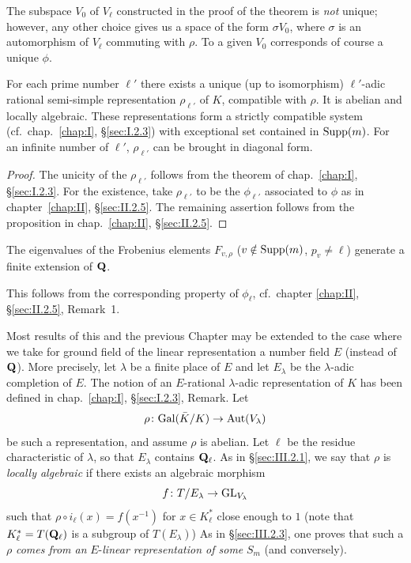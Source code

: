 
The subspace $V_0$ of $V_\ell$ constructed in the proof of the theorem is
\emph{not} unique; however, any other choice gives us a space of the form
$\sigma V_0$, where $\sigma$ is an automorphism of $V_\ell$ commuting
with $\rho$.  To a given $V_0$ corresponds of course a unique $\phi$.

\begin{corollary}[1]\label{cor:III.2.3.1}
For each prime number $\ell'$ there exists a unique (up to isomorphism)
$\ell'$-adic rational semi-simple representation $\rho_{\ell'}$ of $K$,
compatible with $\rho$.  It is abelian and locally algebraic.  These
representations form a strictly compatible system
(cf.~chap.~\ref{chap:I}, \S\ref{sec:I.2.3}) with exceptional set contained
in $\mathrm{Supp}(m)$.  For an infinite number of $\ell'$, $\rho_{\ell'}$ can be
brought in diagonal form.
\end{corollary}

\begin{proof}
The unicity of the $\rho_{\ell'}$ follows from the theorem of
chap.~\ref{chap:I}, \S\ref{sec:I.2.3}.  For the existence, take
$\rho_{\ell'}$ to be the $\phi_{\ell'}$ associated to $\phi$ as in
chapter~\ref{chap:II}, \S\ref{sec:II.2.5}.  The remaining assertion
follows from the proposition in chap.~\ref{chap:II},
\S\ref{sec:II.2.5}.
\end{proof}

\begin{corollary}[2]\label{cor:III.2.3.2}
The eigenvalues of the Frobenius elements $F_{v,\rho}$
($v\notin\mathrm{Supp}(m)$, $p_v\neq\ell$) generate a finite extension of $\mathbf{Q}$.
\end{corollary}

This follows from the corresponding property of $\phi_\ell$, cf.~chapter
\ref{chap:II}, \S\ref{sec:II.2.5}, Remark~1.


Most results of this and the previous Chapter may be extended to the case
where we take for ground field of the linear representation a number
field $E$ (instead of $\mathbf{Q}$).  More precisely, let $\lambda$ be a finite
place of $E$ and let $E_\lambda$ be the $\lambda$-adic completion of $E$.
The notion of an $E$-rational $\lambda$-adic representation of $K$ has
been defined in chap.~\ref{chap:I}, \S\ref{sec:I.2.3}, Remark.  Let
\[
\rho\colon \mathrm{Gal}(\bar K/K) \to \mathrm{Aut}(V_\lambda)
\]
be such a representation, and assume $\rho$ is abelian.  Let $\ell$ be
the residue characteristic of $\lambda$, so that $E_\lambda$ contains
$\mathbf{Q}_\ell$.  As in \S\ref{sec:III.2.1}, we say that $\rho$ is \emph{locally
algebraic} if there exists an algebraic morphism
\[
f\colon T/E_\lambda \to \mathrm{GL}_{V_\lambda}
\]
such that $\rho\circ i_\ell(x) = f(x^{-1})$ for $x\in K_\ell^*$ close
enough to $1$ (note that $K_\ell^* = T(\mathbf{Q}_\ell)$ is a subgroup of
$T(E_\lambda)$)
As in \S\ref{sec:III.2.3}, one proves that such a $\rho$ \emph{comes from
an} $E$-\emph{linear representation of some} $S_m$ (and conversely).


